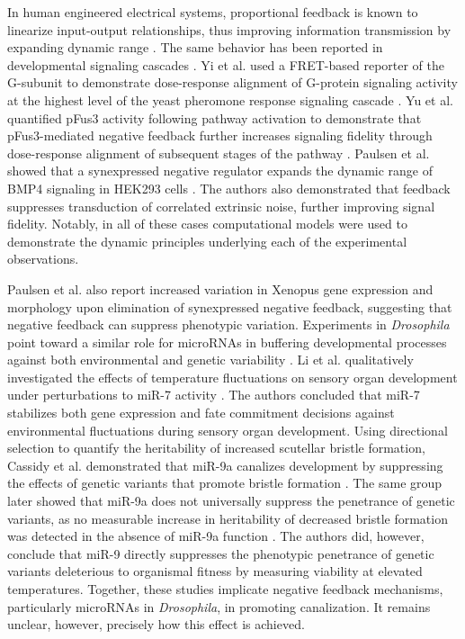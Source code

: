 In human engineered electrical systems, proportional feedback is known to linearize input-output relationships, thus improving information transmission by expanding dynamic range \cite{Black}. The same behavior has been reported in developmental signaling cascades \cite{Bhalla2002,Cheong2011,Paulsen2011,Yi2003,Yu2008}. Yi et al. used a FRET-based reporter of the G\textalpha-subunit to demonstrate dose-response alignment of G-protein signaling activity at the highest level of the yeast pheromone response signaling cascade \cite{Yi2003}. Yu et al. quantified pFus3 activity following pathway activation to demonstrate that pFus3-mediated negative feedback further increases signaling fidelity through dose-response alignment of subsequent stages of the pathway \cite{Yu2008}. Paulsen et al. showed that a synexpressed negative regulator expands the dynamic range of BMP4 signaling in HEK293 cells \cite{Paulsen2011}. The authors also demonstrated that feedback suppresses transduction of correlated extrinsic noise, further improving signal fidelity. Notably, in all of these cases computational models were used to demonstrate the dynamic principles underlying each of the experimental observations. 

Paulsen et al. also report increased variation in Xenopus gene expression and morphology upon elimination of synexpressed negative feedback, suggesting that negative feedback can suppress phenotypic variation. Experiments in \textit{Drosophila} point toward a similar role for microRNAs in buffering developmental processes against both environmental and genetic variability \cite{Cassidy2016,Cassidy2013,Li2009}. Li et al. qualitatively investigated the effects of temperature fluctuations on sensory organ development under perturbations to miR-7 activity \cite{Li2009}. The authors concluded that miR-7 stabilizes both gene expression and fate commitment decisions against environmental fluctuations during sensory organ development. Using directional selection to quantify the heritability of increased scutellar bristle formation, Cassidy et al. demonstrated that miR-9a canalizes development by suppressing the effects of genetic variants that promote bristle formation \cite{Cassidy2013}. The same group later showed that miR-9a does not universally suppress the penetrance of genetic variants, as no measurable increase in heritability of decreased bristle formation was detected in the absence of miR-9a function \cite{Cassidy2016}. The authors did, however, conclude that miR-9 directly suppresses the phenotypic penetrance of genetic variants deleterious to organismal fitness by measuring viability at elevated temperatures. Together, these studies implicate negative feedback mechanisms, particularly microRNAs in \textit{Drosophila}, in promoting canalization. It remains unclear, however, precisely how this effect is achieved.




